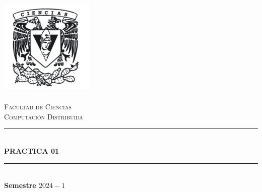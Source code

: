 \begin{titlepage}
    \center%
    \newcommand{\HRule}{\rule{\linewidth}{0.5mm}} 
    
    \includegraphics[width=4.5cm]{IMA/Ciencias.png} \\ 
    
    \quad \\[1.5cm]
    \textsc{\Large Facultad de Ciencias}\\[0.5cm] %
    \textsc{\Large Computación Distribuida}\\[0.5cm] %
    \makeatletter
        \HRule\\ [0.4cm]
            { \huge \bfseries PRACTICA 01}\\
        \HRule\\ [0.4cm]
    \large\textbf{Semestre $2024-1$}\\
    

\end{titlepage}
